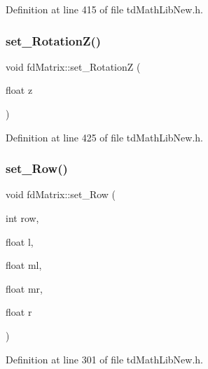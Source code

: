 Definition at line 415 of file td\+Math\+Lib\+New.\+h.

\hypertarget{classfd_matrix_a17251b926dd6ae66fc367b0fdf162774}{}\label{classfd_matrix_a17251b926dd6ae66fc367b0fdf162774} 
\subsubsection{\texorpdfstring{set\+\_\+\+Rotation\+Z()}{set\_RotationZ()}}
{\footnotesize\ttfamily void fd\+Matrix\+::set\+\_\+\+RotationZ (\begin{DoxyParamCaption}\item[{float}]{z }\end{DoxyParamCaption})\hspace{0.3cm}{\ttfamily [inline]}}



Definition at line 425 of file td\+Math\+Lib\+New.\+h.

\hypertarget{classfd_matrix_a1e45875cef8577b3165990336095e92c}{}\label{classfd_matrix_a1e45875cef8577b3165990336095e92c} 
\subsubsection{\texorpdfstring{set\+\_\+\+Row()}{set\_Row()}}
{\footnotesize\ttfamily void fd\+Matrix\+::set\+\_\+\+Row (\begin{DoxyParamCaption}\item[{int}]{row,  }\item[{float}]{l,  }\item[{float}]{ml,  }\item[{float}]{mr,  }\item[{float}]{r }\end{DoxyParamCaption})\hspace{0.3cm}{\ttfamily [inline]}}



Definition at line 301 of file td\+Math\+Lib\+New.\+h.

\hypertarget{classfd_matrix_af043c14d7fbe5f0e7b34e621719f7fed}{}\label{classfd_matrix_af043c14d7fbe5f0e7b34e621719f7fed} 
